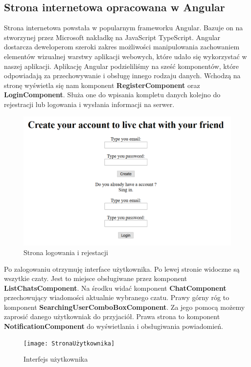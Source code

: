 \documentclass[12pt,a4paper]{article}
\begin{document}
\subsection{Strona internetowa opracowana w Angular}
\hspace*{0.7cm} Strona internetowa powstała w popularnym frameworku Angular. Bazuje on na stworzynej przez Microsoft nakładkę na JavaScript TypeScript. Angular dostarcza deweloperom szeroki zakres możliwości manipulowania zachowaniem elementów wizualnej warstwy aplikacji webowych, które udało się wykorzystać w naszej aplikacji.
 \hspace*{0.7cm} Aplikację Angular podzieliliśmy na sześć komponentów, które odpowiadają za przechowywanie i obsługę innego rodzaju danych. Wchodzą na stronę wyświetla się nam komponent \textbf{RegisterComponent} oraz \textbf{LoginComponent}. Służa one do wpisania kompletu danych kolejno do rejestracji lub logowania i wysłania informacji na serwer. 
 
\begin{figure}[H]
	\centering
	\includegraphics[width=0.7\linewidth]{FirstPage}
	\caption{Strona logowania i rejestacji}
	\label{fig:firstpage}
\end{figure}

\hspace*{0.7cm} Po zalogowaniu otrzymuję interface użytkownika. Po lewej stronie widoczne są wszytkie czaty. Jest to miejsce obsługiwane przez komponent \textbf{ListChatsComponent}. Na środku widać komponent \textbf{ChatComponent} przechowujący wiadomości aktualnie wybranego czatu. Prawy górny róg to komponent \textbf{SearchingUserComboBoxComponent}. Za jego pomocą możemy zaprosić danego użytkowniak do przyjaciół. Prawa strona to komponent \textbf{NotificationComponent} do wyświetlania i obsługiwania powiadomień.

\begin{figure}[H]
	\centering
	\texttt{[image: StronaUżytkownika]}
	\caption{Interfejs użytkownika}
	\label{fig:stronauzytkownika}
\end{figure}
\end{document}
